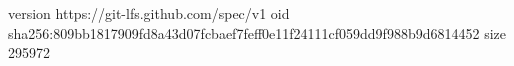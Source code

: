 version https://git-lfs.github.com/spec/v1
oid sha256:809bb1817909fd8a43d07fcbaef7feff0e11f24111cf059dd9f988b9d6814452
size 295972
